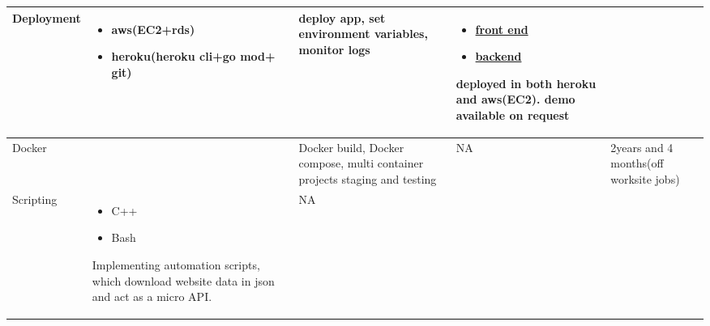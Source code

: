 \begin{center}
\begin{tabular}{|p{1.5cm}|p{2cm}|p{7cm}|p{7cm}|p{2cm}| }

    Deployment 
    & \begin{itemize}
	\item aws(EC2+rds) 
	\item heroku(heroku
    cli+go mod+ git) 
    \end{itemize}
    & deploy app, set environment variables, monitor logs
    & \begin{itemize} 
	    \item \href{https://kuriancoding.github.io/graph.html}{front end}
	    \item \href{https://github.com/kurianCoding/demoback}{backend} 
    \end{itemize} 
    deployed in both heroku and aws(EC2).
    demo available on request
    & \\ 
\hline

 Docker 
& 
    & Docker build, Docker compose, multi container projects
    staging and testing 
& NA 
    &  2years and 4 months(off worksite jobs)\\
\hline
Scripting
    &  \begin{itemize} 
    \item C++ 
    \item Bash 
    \end{itemize}
  Implementing automation scripts, which download website data in json and act as a micro API. 
 & NA
 & 
 & \\
 \hline
\end{tabular}
\end{center}

\endgroup

